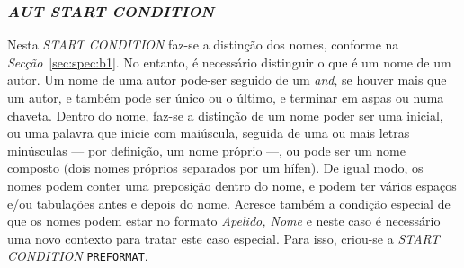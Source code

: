 \subsubsection{\emph{AUT \emph{START CONDITION}}}
\label{subsubsection:des:b1}

Nesta \emph{START CONDITION} faz-se a distinção dos nomes, conforme na
\emph{Secção}~\ref{sec:spec:b1}. No entanto, é necessário distinguir o que é um
nome de um autor. Um nome de uma autor pode-ser seguido de um \emph{and}, se
houver mais que um autor, e também pode ser único ou o último, e terminar em
aspas ou numa chaveta. Dentro do nome, faz-se a distinção de um nome poder ser
uma inicial, ou uma palavra que inicie com maiúscula, seguida de uma ou mais
letras minúsculas --- por definição, um nome próprio ---, ou pode ser um nome
composto (dois nomes próprios separados por um hífen). De igual modo, os nomes
podem conter uma preposição dentro do nome, e podem ter vários espaços e/ou
tabulações antes e depois do nome. Acresce também a condição especial de que os
nomes podem estar no formato \emph{Apelido, Nome} e neste caso é necessário uma novo
contexto para tratar este caso especial. Para isso, criou-se a \emph{START
CONDITION} \texttt{PREFORMAT}. 




